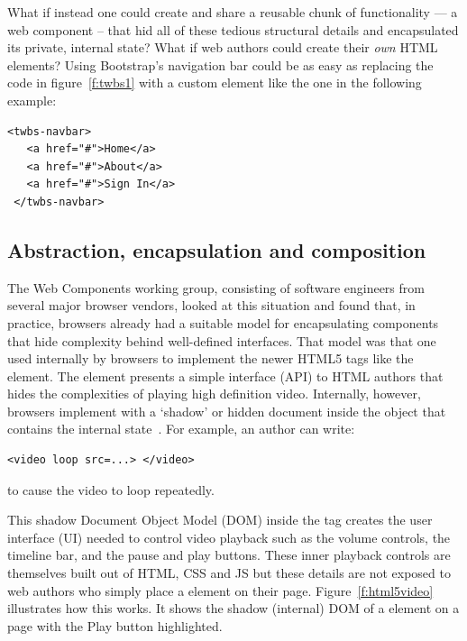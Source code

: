 What if instead one could create and share a reusable chunk of functionality --- a web component -- that hid all of these tedious structural details and encapsulated its private, internal state? 
What if web authors could create their \textit{own} HTML elements?  
Using Bootstrap's navigation bar could be as easy as replacing the code in figure~\ref{f:twbs1} with a custom element like the one in the following example:

% 

\begin{lstlisting}[language=HTML5,numbers=none,caption=
{Hypothetical Bootstrap nav bar custom element.},label=l:twbs2,captionpos=below]
 <twbs-navbar>
   <a href="#">Home</a>
   <a href="#">About</a>
   <a href="#">Sign In</a>
 </twbs-navbar>
\end{lstlisting}

\subsection{Abstraction, encapsulation and composition}

The Web Components working group, consisting of software engineers from several major browser vendors, 
looked at this situation and found that, in practice, browsers already had a suitable model for encapsulating components that hide complexity behind well-defined interfaces.
That model was that one used internally by browsers to implement the newer HTML5 tags like the \textbf{} element. 
The  element presents a simple interface (API) to HTML authors that hides the complexities of playing high definition video.
Internally, however, browsers implement  with a `shadow' or hidden document inside the object that contains the internal state~\cite{kitamura2014}. 
For example, an author can write:
\begin{lstlisting}[language=HTML5,numbers=none]
	<video loop src=...> </video>
\end{lstlisting}
to cause the video to loop repeatedly.

This shadow Document Object Model (DOM) inside the 
 tag creates the user interface (UI) needed to control video playback such as the volume controls, the timeline bar, and the pause and play buttons.
These inner playback controls are themselves built out of HTML, CSS and JS but these details are not exposed to web authors who simply place a  element on their page. 
Figure~\ref{f:html5video} illustrates how this works. It shows the shadow (internal) DOM of a  element on a page with the Play button  highlighted.

